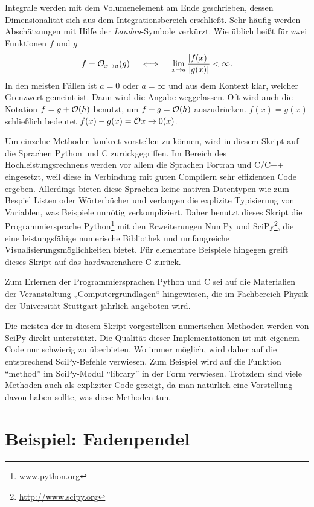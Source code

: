 Integrale werden mit dem Volumenelement am Ende geschrieben, dessen
Dimensionalität sich aus dem Integrationsbereich erschließt. Sehr
häufig werden Abschätzungen mit Hilfe der \emph{Landau}-Symbole
verkürzt. Wie üblich heißt für zwei Funktionen $f$ und $g$
\begin{equation*}
  f = \mathcal O_{x\to a}(g) \quad\iff\quad \lim_{x\to a}
  \frac{\lvert f(x)\rvert}{\lvert g(x)\rvert}<\infty.
\end{equation*}
In den meisten Fällen ist $a=0$ oder $a=\infty$ und aus dem Kontext
klar, welcher Grenzwert gemeint ist. Dann wird die Angabe
weggelassen. Oft wird auch die Notation $f = g + \mathcal O(h)$ benutzt, um $f
+ g = \mathcal O(h)$ auszudrücken. $f(x) \dot{=} g(x)$ schließlich bedeutet 
$f(x) - g(x) = \mathcal O{x\to 0}(x)$.

Um einzelne Methoden konkret vorstellen zu können, wird in diesem
Skript auf die Sprachen Python und C zurückgegriffen. Im Bereich des
Hochleistungsrechnens werden vor allem die Sprachen Fortran und C/C++
eingesetzt, weil diese in Verbindung mit guten Compilern sehr
effizienten Code ergeben. Allerdings bieten diese Sprachen keine
nativen Datentypen wie zum Bespiel Listen oder Wörterbücher und
verlangen die explizite Typisierung von Variablen, was Beispiele
unnötig verkompliziert. Daher benutzt dieses Skript die
Programmiersprache Python\footnote{\url{www.python.org}} mit den
Erweiterungen NumPy und SciPy\footnote{\url{http://www.scipy.org}},
die eine leistungsfähige numerische Bibliothek und umfangreiche
Visualisierungsmöglichkeiten bietet. Für elementare Beispiele hingegen
greift dieses Skript auf das hardwarenähere C zurück.

Zum Erlernen der Programmiersprachen Python und C sei auf die
Materialien der Veranstaltung „Computergrundlagen“ hingewiesen, die im
Fachbereich Physik der Universität Stuttgart jährlich angeboten
wird.

Die meisten der in diesem Skript vorgestellten numerischen Methoden
werden von SciPy direkt unterstützt. Die Qualität dieser
Implementationen ist mit eigenem Code nur schwierig zu überbieten. Wo
immer möglich, wird daher auf die entsprechend SciPy-Befehle
verwiesen. Zum Beispiel wird auf die Funktion "`method"' im
SciPy-Modul "`library"' in der Form
 verwiesen. Trotzdem
sind viele Methoden auch als expliziter Code gezeigt, da man natürlich
eine Vorstellung davon haben sollte, was diese Methoden tun.

\section{Beispiel: Fadenpendel}

